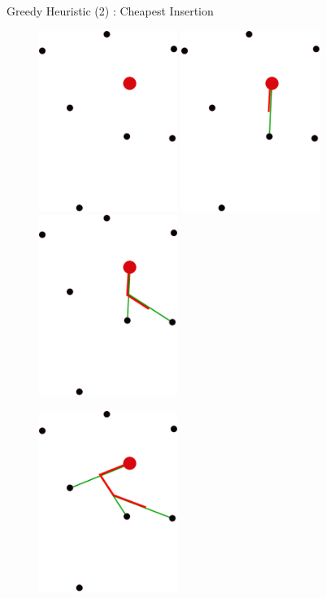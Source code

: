 \documentclass{beamer}
\begin{document}
\begin{frame}{Greedy Heuristic (2) : Cheapest Insertion }

  \begin{figure}[H]
    \centering
      {%
      \includegraphics[width=4.5cm]{slide_imgs/input.eps}
      }%
      {%
        \includegraphics[width=4.5cm]{slide_imgs/point1.eps}
      }%
      {%
        \includegraphics[width=4.5cm]{slide_imgs/point2.eps}
      }%

      {%
        \includegraphics[width=4.5cm]{slide_imgs/point3.eps}
      }%


\end{figure}
\end{frame}
\end{document}
